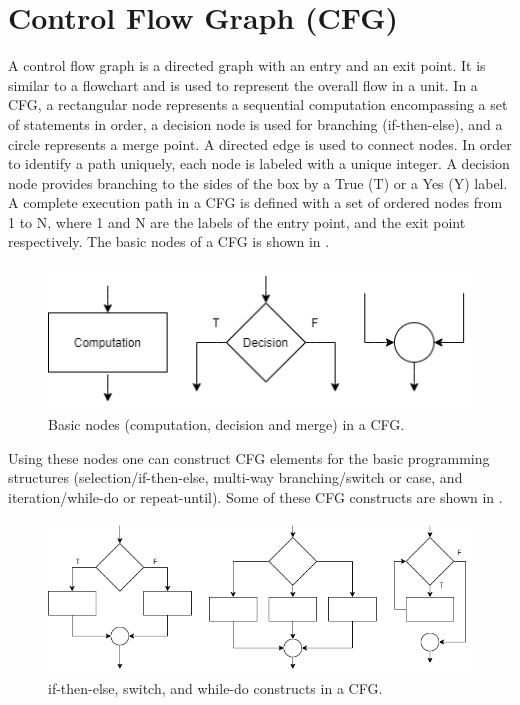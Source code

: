 \section{Control Flow Graph (CFG)}
A control flow graph is a directed graph with an entry and an exit point. It is similar to a flowchart and is used to represent the overall flow in a unit. In a CFG, a rectangular node represents a sequential computation encompassing a set of statements in order, a decision node is used for branching (if-then-else), and a circle represents a merge point. A directed edge is used to connect nodes. In order to identify a path uniquely, each node is labeled with a unique integer. A decision node provides branching to the sides of the box by a True (T) or a Yes (Y) label. A complete execution path in a CFG is defined with a set of ordered nodes from 1 to N, where 1 and N are the labels of the entry point, and the exit point respectively. The basic nodes of a CFG is shown in .

\begin{figure}[!ht]
    \includegraphics{images/cfg-figure-3-1.png}
    \caption{Basic nodes (computation, decision and merge) in a CFG.}
\end{figure}

Using these nodes one can construct CFG elements for the basic programming structures (selection/if-then-else, multi-way branching/switch or case, and iteration/while-do or repeat-until). Some of these CFG constructs are shown in .

\begin{figure}[!ht]
    \includegraphics{images/cfg-figure-3-2.png}
    \caption{if-then-else, switch, and while-do constructs in a CFG.}
\end{figure}

